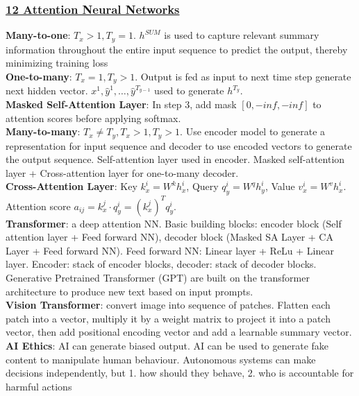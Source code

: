 \documentclass{article}
\begin{document}
{\begin{multicols*}{3}
\subsubsection*{\underline{12 Attention Neural Networks}}
\textbf{Many-to-one}: $T_x>1,T_y=1$. $h^{SUM}$ is used to capture relevant summary information throughout the entire input sequence to predict the output, thereby minimizing training loss\\
\textbf{One-to-many}: $T_x=1,T_y>1$. Output is fed as input to next time step generate next hidden vector. $x^1, \hat{y}^1,\dots,\hat{y}^{T_{y-1}}$ used to generate $h^{T_y}$. \\
\textbf{Masked Self-Attention Layer}: In step 3, add mask $[0, -inf, -inf]$ to attention scores before applying softmax. \\
\textbf{Many-to-many}: $T_x\not=T_y,T_x>1,T_y>1$. Use encoder model to generate a representation for input sequence and decoder to use encoded vectors to generate the output sequence. Self-attention layer used in encoder. Masked self-attention layer + Cross-attention layer for one-to-many decoder. \\
\textbf{Cross-Attention Layer}: Key $k_x^i=W^kh_x^i$, Query $q_y^i=W^qh_y^i$, Value $v_x^i=W^vh_x^i$. Attention score $a_{ij}=k_x^j\cdot q_y^i=(k_x^j)^Tq_y^i$. \\
\textbf{Transformer}: a deep attention NN. Basic building blocks: encoder block (Self attention layer + Feed forward NN), decoder block (Masked SA Layer + CA Layer + Feed forward NN). Feed forward NN: Linear layer + ReLu + Linear layer. Encoder: stack of encoder blocks, decoder: stack of decoder blocks. Generative Pretrained Transformer (GPT) are built on the transformer architecture to produce new text based on input prompts. \\
\textbf{Vision Transformer}: convert image into sequence of patches. Flatten each patch into a vector, multiply it by a weight matrix to project it into a patch vector, then add positional encoding vector and add a learnable summary vector. \\
\textbf{AI Ethics}: AI can generate biased output. AI can be used to generate fake content to manipulate human behaviour. Autonomous systems can make decisions independently, but 1. how should they behave, 2. who is accountable for harmful actions \\
\end{multicols*}
}
\end{document}
